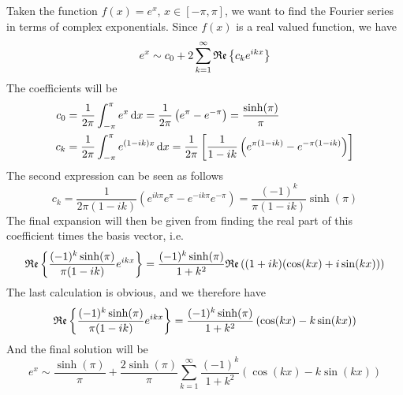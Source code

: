 \documentclass[../complete.tex]{subfiles}
\begin{document}
\begin{eg}
	Taken the function $f(x)=e^x$, $x\in[-\pi,\pi]$, we want to find the Fourier series in terms of complex exponentials. Since $f(x)$ is a real valued function, we have
	\begin{equation*}
		e^x\sim c_0+2\sum_{k=1}^{\infty}\mathfrak{Re}\left\{ c_ke^{ikx} \right\}
	\end{equation*}
	The coefficients will be
	\begin{equation*}
		\begin{aligned}
			c_0&=\frac{1}{2\pi}\int_{-\pi}^{\pi}e^x\operatorname{d\!} x=\frac{1}{2\pi}\left( e^{\pi}-e^{-\pi} \right)=\frac{\sinh(\pi)}{\pi}\\
			c_k&=\frac{1}{2\pi}\int_{-\pi}^{\pi}e^{(1-ik)x}\operatorname{d\!} x=\frac{1}{2\pi}\left[ \frac{1}{1-ik}\left( e^{\pi(1-ik)}-e^{-\pi(1-ik)} \right) \right]
		\end{aligned}
	\end{equation*}
	The second expression can be seen as follows
	\begin{equation*}
		c_k=\frac{1}{2\pi(1-ik)}\left( e^{ik\pi}e^\pi-e^{-ik\pi}e^{-\pi} \right)=\frac{(-1)^k}{\pi(1-ik)}\sinh(\pi)
	\end{equation*}
	The final expansion will then be given from finding the real part of this coefficient times the basis vector, i.e.
	\begin{equation*}
		\mathfrak{Re}\left\{ \frac{(-1)^k\sinh(\pi)}{\pi(1-ik)}e^{ikx} \right\}=\frac{(-1)^k\sinh(\pi)}{1+k^2}\mathfrak{Re}\left( (1+ik)(\cos(kx)+i\sin(kx)) \right)
	\end{equation*}
	The last calculation is obvious, and we therefore have
	\begin{equation*}
		\mathfrak{Re}\left\{ \frac{(-1)^k\sinh(\pi)}{\pi(1-ik)}e^{ikx} \right\}=\frac{(-1)^k\sinh(\pi)}{1+k^2}\left( \cos(kx)-k\sin(kx) \right)
	\end{equation*}
	And the final solution will be
	\begin{equation*}
		e^x\sim\frac{\sinh(\pi)}{\pi}+\frac{2\sinh(\pi)}{\pi}\sum_{k=1}^{\infty}\frac{(-1)^k}{1+k^2}\left( \cos(kx)-k\sin(kx) \right)
	\end{equation*}
\end{eg}
\end{document}

